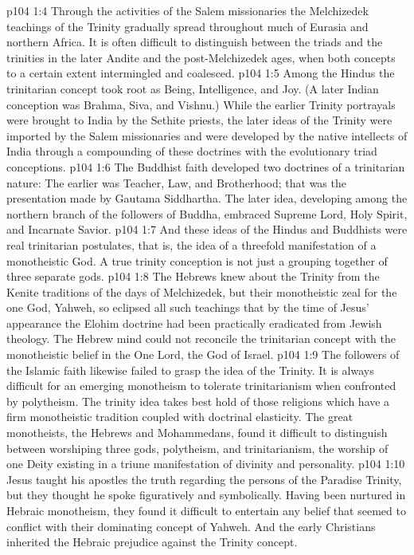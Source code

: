 \vs p104 1:4 Through the activities of the Salem missionaries the Melchizedek teachings of the Trinity gradually spread throughout much of Eurasia and northern Africa. It is often difficult to distinguish between the triads and the trinities in the later Andite and the post\hyp{}Melchizedek ages, when both concepts to a certain extent intermingled and coalesced.
\pc \vs p104 1:5 Among the Hindus the trinitarian concept took root as Being, Intelligence, and Joy. (A later Indian conception was Brahma, Siva, and Vishnu.) While the earlier Trinity portrayals were brought to India by the Sethite priests, the later ideas of the Trinity were imported by the Salem missionaries and were developed by the native intellects of India through a compounding of these doctrines with the evolutionary triad conceptions.
\vs p104 1:6 The Buddhist faith developed two doctrines of a trinitarian nature: The earlier was Teacher, Law, and Brotherhood; that was the presentation made by Gautama Siddhartha. The later idea, developing among the northern branch of the followers of Buddha, embraced Supreme Lord, Holy Spirit, and Incarnate Savior.
\vs p104 1:7 And these ideas of the Hindus and Buddhists were real trinitarian postulates, that is, the idea of a threefold manifestation of a monotheistic God. A true trinity conception is not just a grouping together of three separate gods.
\pc \vs p104 1:8 The Hebrews knew about the Trinity from the Kenite traditions of the days of Melchizedek, but their monotheistic zeal for the one God, Yahweh, so eclipsed all such teachings that by the time of Jesus’ appearance the Elohim doctrine had been practically eradicated from Jewish theology. The Hebrew mind could not reconcile the trinitarian concept with the monotheistic belief in the One Lord, the God of Israel.
\vs p104 1:9 The followers of the Islamic faith likewise failed to grasp the idea of the Trinity. It is always difficult for an emerging monotheism to tolerate trinitarianism when confronted by polytheism. The trinity idea takes best hold of those religions which have a firm monotheistic tradition coupled with doctrinal elasticity. The great monotheists, the Hebrews and Mohammedans, found it difficult to distinguish between worshiping three gods, polytheism, and trinitarianism, the worship of one Deity existing in a triune manifestation of divinity and personality.
\pc \vs p104 1:10 Jesus taught his apostles the truth regarding the persons of the Paradise Trinity, but they thought he spoke figuratively and symbolically. Having been nurtured in Hebraic monotheism, they found it difficult to entertain any belief that seemed to conflict with their dominating concept of Yahweh. And the early Christians inherited the Hebraic prejudice against the Trinity concept.
